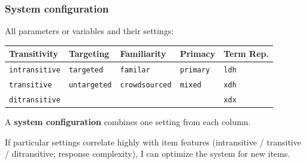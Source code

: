 \documentclass[handout,xcolor={dvipsnames}]{beamer}
\newcommand{\param}[1]{\texttt{#1}}
\begin{document}
\begin{frame}
\frametitle{System configuration}
\small

\vspace{-.5em}
\pause
All parameters or variables and their settings:

\vspace{-.7em}
\begin{table}
\begin{center}
\begin{tabular}{|l|l|l|l|l|}
\hline
\textbf{Trans\-i\-ti\-vi\-ty} & \textbf{Tar\-get\-ing} & \textbf{Fam\-il\-iar\-i\-ty} & \textbf{Prim\-a\-cy} & \textbf{Term Rep.} \\
\hline
\hline
\param{in\-trans\-i\-tive} & \param{tar\-get\-ed} & \param{familar} & \param{prim\-a\-ry} & \param{ldh} \\
\hline
\param{trans\-i\-tive} & \param{un\-tar\-get\-ed} & \param{crowd\-sourced} & \param{mix\-ed} & \param{xdh} \\
\hline
\param{di\-trans\-i\-tive} & & & & \param{xdx} \\
\hline
\end{tabular}
\label{tab:all-params}
\end{center}
\end{table}

\vspace{1.2em}
A \textbf{system configuration} combines one setting from each column.

\vspace{1.2em}
If particular settings correlate highly with item features (intransitive / transitive / ditransitive; response complexity), I can optimize the system for new items.

\end{frame}



%
%
\end{document}
